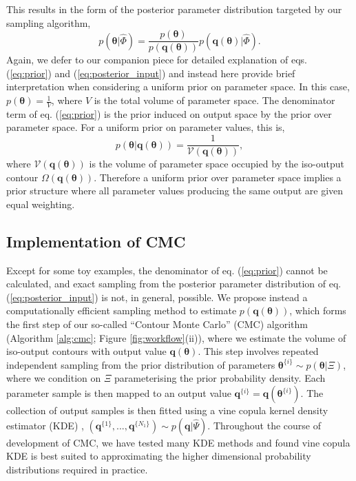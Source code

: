 %
This results in the form of the posterior parameter distribution targeted by our sampling algorithm,
%
\begin{equation}\label{eq:posterior_input}
p(\boldsymbol{\theta}|\hat{\Phi}) = \frac{p(\boldsymbol{\theta})}{p(\boldsymbol{q}(\boldsymbol{\theta}))} p(\boldsymbol{q}(\boldsymbol{\theta})|\hat{\Phi}).
\end{equation}
%
Again, we defer to our companion piece \cite{lambert2018inverse} for detailed explanation of eqs. (\ref{eq:prior}) and (\ref{eq:posterior_input}) and instead here provide brief interpretation when considering a uniform prior on parameter space. In this case, $p(\boldsymbol{\theta}) = \frac{1}{V}$, where $V$ is the total volume of parameter space. The denominator term of eq. (\ref{eq:prior}) is the prior induced on output space by the prior over parameter space. For a uniform prior on parameter values, this is,
%
\begin{equation}\label{eq:contour_volume}
p(\boldsymbol{\theta}|\boldsymbol{q}(\boldsymbol{\theta})) = \frac{1}{\mathcal{V}(\boldsymbol{q}(\boldsymbol{\theta}))},
\end{equation}
%
where $\mathcal{V}(\boldsymbol{q}(\boldsymbol{\theta}))$ is the volume of parameter space occupied by the iso-output contour $\Omega(\boldsymbol{q}(\boldsymbol{\theta}))$. Therefore a uniform prior over parameter space implies a prior structure where all parameter values producing the same output are given equal weighting.

\subsection{Implementation of CMC}

Except for some toy examples, the denominator of eq. (\ref{eq:prior}) cannot be calculated, and exact sampling from the posterior parameter distribution of eq. (\ref{eq:posterior_input}) is not, in general, possible. We propose instead a computationally efficient sampling method to estimate $p(\boldsymbol{q}(\boldsymbol{\theta}))$, which forms the first step of our so-called ``Contour Monte Carlo'' (CMC) algorithm (Algorithm \ref{alg:cmc}; Figure \ref{fig:workflow}(ii)), where we estimate the volume of iso-output contours with output value $\boldsymbol{q}(\boldsymbol{\theta})$. This step involves repeated independent sampling from the prior distribution of parameters $\boldsymbol{\theta}^{\{i\}}\sim p(\boldsymbol{\theta}|\Xi)$, where we condition on $\Xi$ parameterising the prior probability density.
Each parameter sample is then mapped to an output value $\boldsymbol{q}^{\{i\}}=\boldsymbol{q}(\boldsymbol{\theta}^{\{i\}})$. The collection of output samples is then fitted using a vine copula kernel density estimator (KDE) \cite{nagler2016evading}, $(\boldsymbol{q}^{\{1\}},...,\boldsymbol{q}^{\{N_1\}})\sim p({\boldsymbol{q}}|\hat{\Psi})$. Throughout the course of development of CMC, we have tested many KDE methods and found vine copula KDE is best suited to approximating the higher dimensional probability distributions required in practice.


